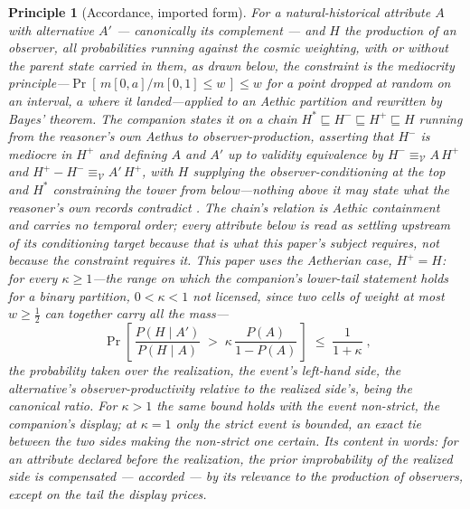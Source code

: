 \documentclass[11pt]{article}
\newtheorem{principle}{Principle}
\theoremstyle{definition}
\begin{document}
\begin{principle}[Accordance, imported form]
\label{prin:accordance-imported}
For a natural-historical attribute $A$ with alternative $A'$ --- canonically its complement --- and $H$ the production of an observer, all probabilities running against the cosmic weighting, with or without the parent state carried in them, as drawn below, the constraint is the mediocrity principle---$\Pr[\,m[0,a]/m[0,1] \le w\,] \le w$ for a point dropped at random on an interval, $a$ where it landed---applied to an Aethic partition and rewritten by Bayes' theorem. The companion states it on a chain $H^{\ast} \sqsubseteq H^{-} \sqsubseteq H^{+} \sqsubseteq H$ running from the reasoner's own Aethus to observer-production, asserting that $H^{-}$ is mediocre in $H^{+}$ and defining $A$ and $A'$ up to validity equivalence by $H^{-} \equiv_{\mathcal{V}} A\,H^{+}$ and $H^{+} - H^{-} \equiv_{\mathcal{V}} A'\,H^{+}$, with $H$ supplying the observer-conditioning at the top and $H^{\ast}$ constraining the tower from below---nothing above it may state what the reasoner's own records contradict \cite{Nexus}. The chain's relation is Aethic containment and carries no temporal order; every attribute below is read as settling upstream of its conditioning target because that is what this paper's subject requires, not because the constraint requires it. This paper uses the Aetherian case, $H^{+} = H$: for every $\kappa \ge 1$---the range on which the companion's lower-tail statement holds for a binary partition, $0 < \kappa < 1$ not licensed, since two cells of weight at most $w \ge \tfrac12$ can together carry all the mass---
\begin{equation}
\label{eq:accordance}
\boxed{\; \Pr\!\left[\, \frac{P(H \mid A')}{P(H \mid A)} \;>\; \kappa\, \frac{P(A)}{1 - P(A)} \,\right] \;\le\; \frac{1}{1+\kappa} \;},
\end{equation}
the probability taken over the realization, the event's left-hand side, the alternative's observer-productivity relative to the realized side's, being the \emph{canonical ratio}. For $\kappa > 1$ the same bound holds with the event non-strict, the companion's display; at $\kappa = 1$ only the strict event is bounded, an exact tie between the two sides making the non-strict one certain. Its content in words: for an attribute declared before the realization, the prior improbability of the realized side is compensated --- \emph{accorded} --- by its relevance to the production of observers, except on the tail the display prices.
\end{principle}
\end{document}
